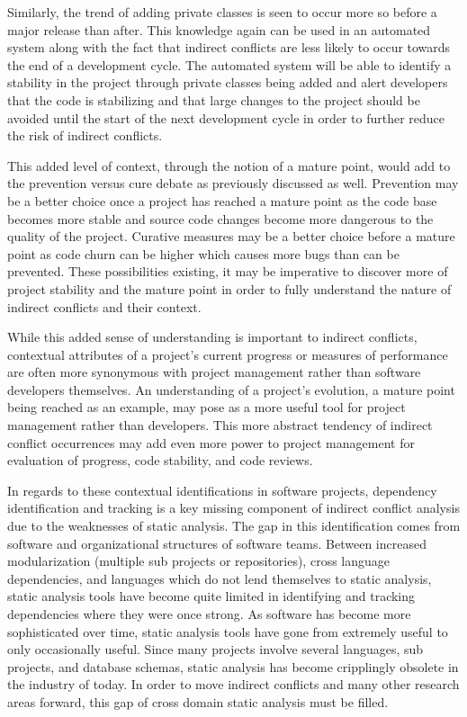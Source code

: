 Similarly, the trend of adding private classes is seen to occur more so before a major release than after. This knowledge again
can be used in an automated system along with the fact that indirect conflicts are less likely to occur towards the end of a development
cycle. The automated system will be able to identify a stability in the project through private classes being added and alert developers
that the code is stabilizing and that large changes to the project should be avoided until the start of the next development cycle
in order to further reduce the risk of indirect conflicts.

This added level of context, through the notion of a mature point, 
would add to the prevention versus cure debate as previously discussed as well. Prevention may be a better
choice once a project has reached a mature point as the code base becomes more stable and source code changes become more dangerous
to the quality of the project. Curative measures may be a better choice before a mature point as code churn can be higher which
causes more bugs than can be prevented. These possibilities existing, it may be imperative to discover more of project stability
and the mature point in order to fully understand the nature of indirect conflicts and their context.

While this added sense of understanding is important to indirect conflicts, contextual attributes of a project's current progress
or measures of performance are often more synonymous with project management
rather than software developers themselves. An understanding of a project's evolution, a mature point being reached as an example,
may pose as a more useful tool for project management rather than developers. This more abstract tendency of indirect
conflict occurrences may add even more power to project management for evaluation of progress, code stability, and code reviews.

In regards to these contextual identifications in software projects, dependency identification and tracking is a key missing component of
indirect conflict analysis due to the weaknesses of static analysis. The gap in this identification comes from software and 
organizational structures of software teams. Between increased modularization (multiple sub projects or repositories), 
cross language dependencies, and languages which do not lend themselves to static analysis, static analysis tools have 
become quite limited in identifying and tracking dependencies where they were once strong. As software has become more
sophisticated over time, static analysis tools have gone from extremely useful to only occasionally useful. Since many
projects involve several languages, sub projects, and database schemas, static analysis has become cripplingly obsolete
in the industry of today. In order to move indirect conflicts and many other research areas forward, this gap of cross domain
static analysis must be filled.

